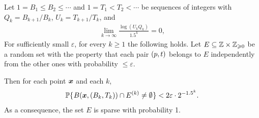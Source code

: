 \documentclass[12pt]{memoir}
\renewcommand{\B}{B}
\newcommand{\Tu}{T}
\renewcommand{\U}{U} %
\begin{document}
\begin{lemma}[Sparsity]\label{lem:sparsiness}
Let $1=\B_{1}\le  \B_{2}\le\dotsm$ and 
$1=\Tu_{1}<T_{2}<\dotsm$ be sequences of integers with
$Q_k = B_{k+1}/B_{k}$, $\U_k = \Tu_{k+1}/\Tu_{k}$, and
\begin{align}\label{eq:assumption}
  \lim_{k\rightarrow\infty}\frac{\log(\U_{k} Q_k)}{1.5^k}=0,
\end{align}
For sufficiently small \( \varepsilon \), for every \( k\ge 1 \) the following holds.
Let \( E\subseteq \mathbb{Z}\times \mathbb{Z}_{\geqslant 0} \)
be a random set with the property that each pair $(p,t)$ belongs to \( E \)
independently from the other ones with probability $\le \varepsilon$.

Then for each point $\boldsymbol{x}$  and each \( k \),
 \begin{align*}
   \Pbof{B(\vek{x},(\B_k, \Tu_{k}))\cap E^{(k)}\neq\emptyset} <2\varepsilon \cdot 2^{-1.5^{k}}.
 \end{align*}
As a consequence, the set \( E \) is sparse with probability 1.
\end{lemma}
\end{document}

